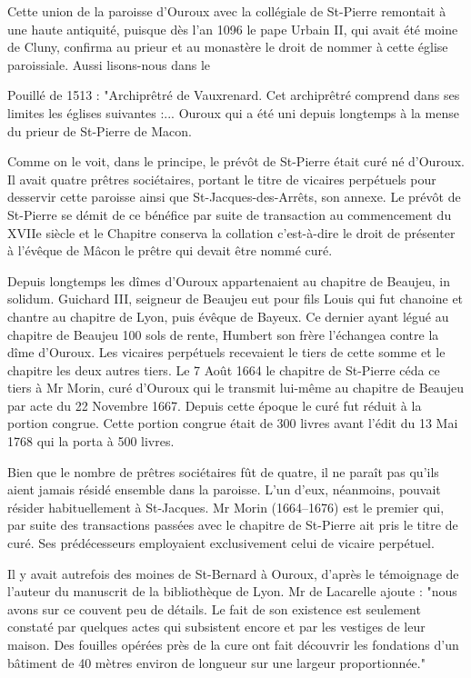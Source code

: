 Cette union de la paroisse d'Ouroux avec la collégiale de St-Pierre remontait à une haute antiquité, puisque dès l'an 1096 le pape Urbain II, qui avait été moine de Cluny, confirma au prieur et au monastère le droit de nommer à cette église paroissiale. Aussi lisons-nous dans le

Pouillé de 1513 : "Archiprêtré de Vauxrenard. Cet archiprêtré comprend dans ses limites les églises suivantes :... Ouroux qui a été uni depuis longtemps à la mense du prieur de St-Pierre de Macon.

Comme on le voit, dans le principe, le prévôt de St-Pierre
était curé né d'Ouroux. Il avait quatre prêtres sociétaires, portant le titre de vicaires perpétuels pour desservir cette paroisse ainsi que St-Jacques-des-Arrêts, son annexe. Le prévôt de St-Pierre se démit de ce bénéfice par suite de transaction au commencement du XVIIe siècle et le Chapitre conserva la collation c'est-à-dire le droit de présenter à l'évêque de Mâcon le prêtre qui devait être nommé curé.

Depuis longtemps les dîmes d'Ouroux appartenaient au chapitre de Beaujeu, in solidum. Guichard III, seigneur de Beaujeu eut pour fils Louis qui fut chanoine et chantre au chapitre de Lyon, puis évêque de Bayeux. Ce dernier ayant légué au chapitre de Beaujeu 100 sols de rente, Humbert son frère l'échangea contre la dîme d'Ouroux. Les vicaires perpétuels recevaient le tiers de cette somme et le chapitre les deux autres tiers. Le 7 Août 1664 le chapitre de St-Pierre céda ce tiers à Mr Morin, curé d'Ouroux qui le transmit lui-même au chapitre de Beaujeu par acte du 22 Novembre 1667. Depuis cette époque le curé fut réduit à la portion congrue. Cette portion congrue était de 300 livres avant l'édit du 13 Mai 1768 qui la porta à 500 livres.

Bien que le nombre de prêtres sociétaires fût de quatre, il ne paraît pas qu'ils aient jamais résidé ensemble dans la paroisse. L'un d'eux, néanmoins, pouvait résider habituellement à St-Jacques. Mr Morin (1664--1676) est le premier qui, par suite des transactions passées avec le chapitre de St-Pierre ait pris le titre de curé. Ses prédécesseurs employaient exclusivement celui de vicaire perpétuel.

Il y avait autrefois des moines de St-Bernard à Ouroux, d'après le témoignage de l'auteur du manuscrit de la bibliothèque de Lyon. Mr de Lacarelle ajoute : "nous avons sur ce couvent peu de détails. Le fait de son existence est seulement constaté par quelques actes qui subsistent encore et par les vestiges de leur maison. Des fouilles opérées près de la cure ont fait découvrir les fondations d'un bâtiment de 40 mètres environ de longueur sur une largeur proportionnée."

